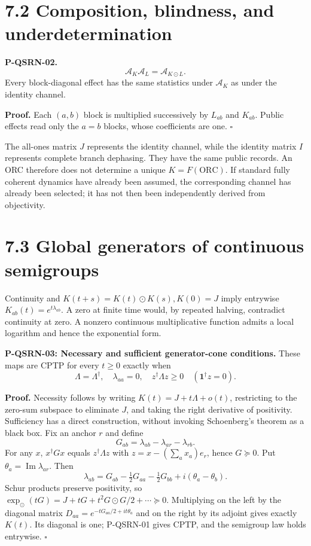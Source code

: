 \documentclass[
  11pt,
  oneside]{book}
\begin{document}
\section{7.2 Composition, blindness, and underdetermination}

\label{p-qsrn-02}{}

\textbf{P-QSRN-02.} \[
\mathcal A_K\mathcal A_L=\mathcal A_{K\odot L}.
\] Every block-diagonal effect has the same statistics under
\(\mathcal A_K\) as under the identity channel.

\textbf{Proof.} Each \((a,b)\) block is multiplied successively by
\(L_{ab}\) and \(K_{ab}\). Public effects read only the \(a=b\) blocks,
whose coefficients are one. \(\square\)

The all-ones matrix \(J\) represents the identity channel, while the
identity matrix \(I\) represents complete branch dephasing. They have
the same public records. An ORC therefore does not determine a unique
\(K=F(\mathrm{ORC})\). If standard fully coherent dynamics have already
been assumed, the corresponding channel has already been selected; it
has not then been independently derived from objectivity.

\section{7.3 Global generators of continuous semigroups}

Continuity and \(K(t+s)=K(t)\odot K(s),K(0)=J\) imply entrywise
\(K_{ab}(t)=e^{t\lambda_{ab}}\). A zero at finite time would, by
repeated halving, contradict continuity at zero. A nonzero continuous
multiplicative function admits a local logarithm and hence the
exponential form.

\label{p-qsrn-03}{}

\textbf{P-QSRN-03: Necessary and sufficient generator-cone conditions.}
These maps are CPTP for every \(t\ge0\) exactly when \[
\Lambda=\Lambda^\dagger,\quad\lambda_{aa}=0,\quad
z^\dagger\Lambda z\ge0\quad(\mathbf1^\dagger z=0).
\]

\textbf{Proof.} Necessity follows by writing \(K(t)=J+t\Lambda+o(t)\),
restricting to the zero-sum subspace to eliminate \(J\), and taking the
right derivative of positivity. Sufficiency has a direct construction,
without invoking Schoenberg's theorem as a black box. Fix an anchor
\(r\) and define \[
G_{ab}=\lambda_{ab}-\lambda_{ar}-\lambda_{rb}.
\] For any \(x\), \(x^\dagger Gx\) equals \(z^\dagger\Lambda z\) with
\(z=x-(\sum_ax_a)e_r\), hence \(G\succeq0\). Put
\(\theta_a=\operatorname{Im}\lambda_{ar}\). Then \[
\lambda_{ab}=G_{ab}-\tfrac12G_{aa}-\tfrac12G_{bb}
+i(\theta_a-\theta_b).
\] Schur products preserve positivity, so
\(\exp_\odot(tG)=J+tG+t^2G\odot G/2+\cdots\succeq0\). Multiplying on the
left by the diagonal matrix \(D_{aa}=e^{-tG_{aa}/2+it\theta_a}\) and on
the right by its adjoint gives exactly \(K(t)\). Its diagonal is one;
P-QSRN-01 gives CPTP, and the semigroup law holds entrywise. \(\square\)
\end{document}
